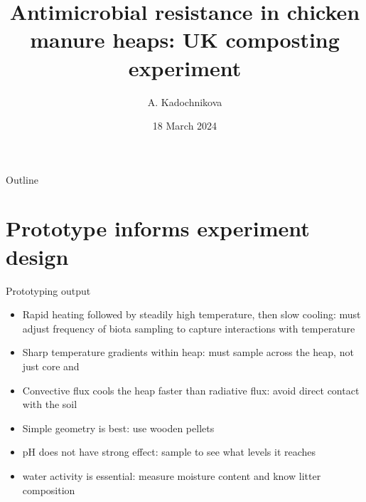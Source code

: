 \documentclass[mathserif,11pt]{beamer}
\title[AMR in poultry litter] %
{Antimicrobial resistance in chicken manure heaps: UK composting experiment}
\author[A. Kadochnikova]{A. Kadochnikova\inst{1}}
\institute[UoN]{\inst{1}
	School of Mathematical Sciences\\
	The University of Nottingham}
\date{18 March 2024}
\begin{document}
\begin{frame}
	\titlepage
\end{frame}
\begin{frame}{Outline}
\tableofcontents[hideallsubsections]
\end{frame}
\section{Prototype informs experiment design}
\begin{frame}{Prototyping output}
	\begin{itemize}
		\item Rapid heating followed by steadily high temperature, then slow cooling: must adjust frequency of biota sampling to capture interactions with temperature
		\item Sharp temperature gradients within heap: must sample across the heap, not just core and 
		\item Convective flux cools the heap faster than radiative flux: avoid direct contact with the soil
		\item Simple geometry is best: use wooden pellets
		\item pH does not have strong effect: sample to see what levels it reaches
		\item water activity is essential: measure moisture content and know litter composition
	\end{itemize}
\end{frame}
\end{document}
